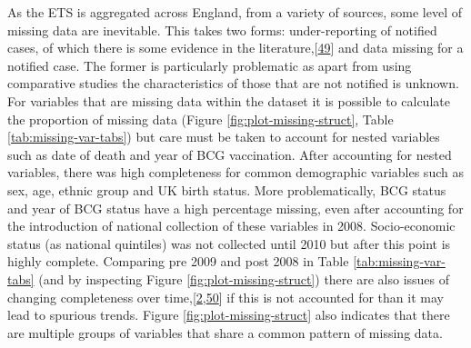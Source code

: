 \documentclass[11pt,twoside]{bristolthesis}
\begin{document}
  As the ETS is aggregated across England, from a variety of sources, some level of missing data are inevitable. This takes two forms: under-reporting of notified cases, of which there is some evidence in the literature,{[}\protect\hyperlink{ref-Pillaye2003}{49}{]} and data missing for a notified case. The former is particularly problematic as apart from using comparative studies the characteristics of those that are not notified is unknown. For variables that are missing data within the dataset it is possible to calculate the proportion of missing data (Figure \ref{fig:plot-missing-struct}, Table \ref{tab:missing-var-tabs}) but care must be taken to account for nested variables such as date of death and year of BCG vaccination. After accounting for nested variables, there was high completeness for common demographic variables such as sex, age, ethnic group and UK birth status. More problematically, BCG status and year of BCG status have a high percentage missing, even after accounting for the introduction of national collection of these variables in 2008. Socio-economic status (as national quintiles) was not collected until 2010 but after this point is highly complete. Comparing pre 2009 and post 2008 in Table \ref{tab:missing-var-tabs} (and by inspecting Figure \ref{fig:plot-missing-struct}) there are also issues of changing completeness over time,{[}\protect\hyperlink{ref-PHE2017}{2},\protect\hyperlink{ref-PHE2016}{50}{]} if this is not accounted for than it may lead to spurious trends. Figure \ref{fig:plot-missing-struct} also indicates that there are multiple groups of variables that share a common pattern of missing data.
  
\end{document}

